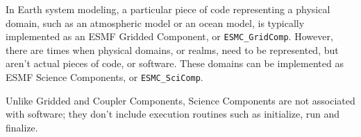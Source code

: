 %


\label{sec:SciComp}

In Earth system modeling, a particular piece of code representing a physical 
domain, such as an atmospheric model or an ocean model, is typically 
implemented as an ESMF Gridded Component, or {\tt ESMC\_GridComp}.  
However, there are times when physical domains, or realms, need to be 
represented, but aren't actual pieces of code, or software.  These domains 
can be implemented as ESMF Science Components, or {\tt ESMC\_SciComp}.

Unlike Gridded and Coupler Components, Science Components are not associated 
with software; they don't include execution routines such as initialize, 
run and finalize.  
